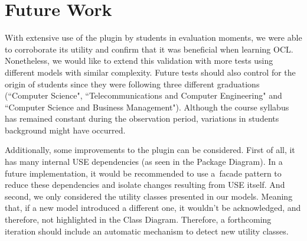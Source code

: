 \section{Future Work}

With extensive use of the plugin by students in evaluation moments, we were able to corroborate its utility and confirm that it was beneficial when learning OCL. Nonetheless, we would like to extend this validation with more tests using different models with similar complexity. Future tests should also control for the origin of students since they were following three different graduations (``Computer Science", ``Telecommunications and Computer Engineering" and ``Computer Science and Business Management"). Although the course syllabus has remained constant during the observation period, variations in students background might have occurred.

Additionally, some improvements to the plugin can be considered. First of all, it has many internal USE dependencies (as seen in the Package Diagram). In a future implementation, it would be recommended to use a~\gls{facade} pattern to reduce these dependencies and isolate changes resulting from USE itself. And second, we only considered the utility classes presented in our models. Meaning that, if a new model introduced a different one, it wouldn't be acknowledged, and therefore, not highlighted in the Class Diagram. Therefore, a forthcoming iteration should include an automatic mechanism to detect new utility classes.

